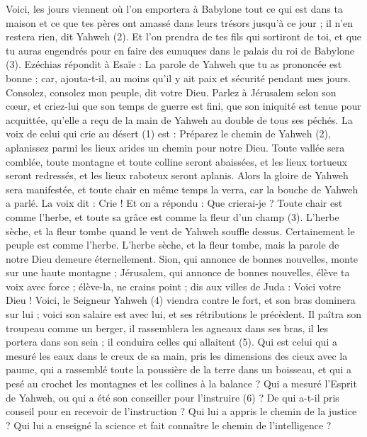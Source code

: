\begin{multicols}{2}
Voici, les jours viennent où l’on emportera à Babylone tout ce qui est dans ta maison et ce que tes pères ont amassé dans leurs trésors jusqu'à ce jour ; il n'en restera rien, dit Yahweh (2).
Et l’on prendra de tes fils qui sortiront de toi, et que tu auras engendrés pour en faire des eunuques dans le palais du roi de Babylone (3).
Ezéchias répondit à Esaïe : La parole de Yahweh que tu as prononcée est bonne ; car, ajouta-t-il, au moins qu'il y ait paix et sécurité pendant mes jours.
\VerseOne{}Consolez, consolez mon peuple, dit votre Dieu.
Parlez à Jérusalem selon son cœur, et criez-lui que son temps de guerre est fini, que son iniquité est tenue pour acquittée, qu'elle a reçu de la main de Yahweh au double de tous ses péchés.
La voix de celui qui crie au désert (1) est : Préparez le chemin de Yahweh (2), aplanissez parmi les lieux arides un chemin pour notre Dieu.
Toute vallée sera comblée, toute montagne et toute colline seront abaissées, et les lieux tortueux seront redressés, et les lieux raboteux seront aplanis.
Alors la gloire de Yahweh sera manifestée, et toute chair en même temps la verra, car la bouche de Yahweh a parlé.
La voix dit : Crie ! Et on a répondu : Que crierai-je ? Toute chair est comme l'herbe, et toute sa grâce est comme la fleur d'un champ (3).
L'herbe sèche, et la fleur tombe quand le vent de Yahweh souffle dessus. Certainement le peuple est comme l'herbe.
L'herbe sèche, et la fleur tombe, mais la parole de notre Dieu demeure éternellement.
Sion, qui annonce de bonnes nouvelles, monte sur une haute montagne ; Jérusalem, qui annonce de bonnes nouvelles, élève ta voix avec force ; élève-la, ne crains point ; dis aux villes de Juda : Voici votre Dieu !
Voici, le Seigneur Yahweh (4) viendra contre le fort, et son bras dominera sur lui ; voici son salaire est avec lui, et ses rétributions le précèdent.
Il paîtra son troupeau comme un berger, il rassemblera les agneaux dans ses bras, il les portera dans son sein ; il conduira celles qui allaitent (5).
Qui est celui qui a mesuré les eaux dans le creux de sa main, pris les dimensions des cieux avec la paume, qui a rassemblé toute la poussière de la terre dans un boisseau, et qui a pesé au crochet les montagnes et les collines à la balance ?
Qui a mesuré l'Esprit de Yahweh, ou qui a été son conseiller pour l’instruire (6) ?
De qui a-t-il pris conseil pour en recevoir de l’instruction ? Qui lui a appris le chemin de la justice ? Qui lui a enseigné la science et fait connaître le chemin de l’intelligence ?

\end{multicols}
